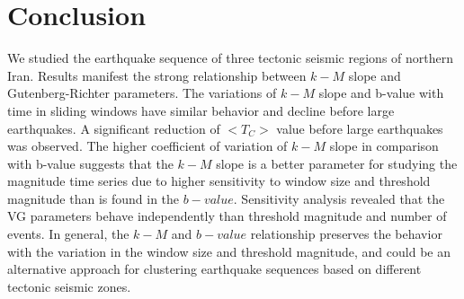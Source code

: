 
\section{Conclusion}
\noindent
We studied the earthquake sequence of three tectonic seismic regions of northern Iran. Results manifest the strong relationship between  $k-M$  slope and Gutenberg-Richter parameters. The variations of  $k-M$  slope and  b-value  with time in sliding windows have similar behavior and decline before large earthquakes. A significant reduction of  $<T_C>$  value before large earthquakes was observed. The higher coefficient of variation of  $k-M$  slope in comparison with  b-value  suggests that the  $k-M$  slope is a better parameter for studying the magnitude time series due to higher sensitivity to window size and threshold magnitude than  is found in the $b-value$. Sensitivity analysis revealed that the VG parameters behave independently than threshold magnitude and number of events. In general,  the $k-M$  and  $b-value$  relationship preserves the behavior with the variation in the window size and threshold magnitude, and could be an alternative approach for clustering earthquake sequences based on different tectonic seismic zones.